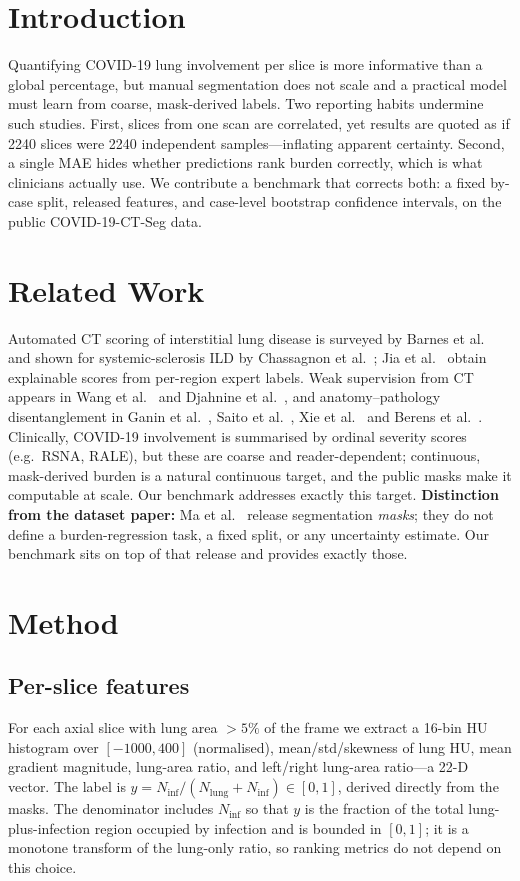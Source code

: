 \documentclass[conference]{IEEEtran}
\begin{document}
\section{Introduction}
Quantifying COVID-19 lung involvement per slice is more informative than a global
percentage, but manual segmentation does not scale and a practical model must
learn from coarse, mask-derived labels. Two reporting habits undermine such
studies. First, slices from one scan are correlated, yet results are quoted as if
2240 slices were 2240 independent samples---inflating apparent certainty.
Second, a single MAE hides whether predictions rank burden correctly, which is
what clinicians actually use. We contribute a benchmark that corrects both: a
fixed by-case split, released features, and case-level bootstrap confidence
intervals, on the public COVID-19-CT-Seg data.

\section{Related Work}
Automated CT scoring of interstitial lung disease is surveyed by Barnes et
al.~\cite{barnes2023mlradiology} and shown for systemic-sclerosis ILD by
Chassagnon et al.~\cite{chassagnon2020dl}; Jia et al.~\cite{jia2024explainable}
obtain explainable scores from per-region expert labels. Weak supervision from CT
appears in Wang et al.~\cite{wang2019weakild} and Djahnine et
al.~\cite{djahnine2024weak}, and anatomy--pathology disentanglement in
Ganin et al.~\cite{ganin2016dann}, Saito et al.~\cite{saito2018mcd}, Xie et
al.~\cite{xie2022disentangle} and Berens et al.~\cite{berens2026shortcut}.
Clinically, COVID-19 involvement is summarised by ordinal severity scores (e.g.\
RSNA, RALE), but these are coarse and reader-dependent; continuous, mask-derived
burden is a natural continuous target, and the public masks make it computable at
scale. Our benchmark addresses exactly this target.
\textbf{Distinction from the dataset paper:} Ma et al.~\cite{ma2021covidseg}
release segmentation \emph{masks}; they do not define a burden-regression task,
a fixed split, or any uncertainty estimate. Our benchmark sits on top of that
release and provides exactly those.

\section{Method}
\subsection{Per-slice features}
For each axial slice with lung area $>5\%$ of the frame we extract a 16-bin HU
histogram over $[-1000,400]$ (normalised), mean/std/skewness of lung HU, mean
gradient magnitude, lung-area ratio, and left/right lung-area ratio---a 22-D
vector. The label is $y=N_{\mathrm{inf}}/(N_{\mathrm{lung}}+N_{\mathrm{inf}})
\in[0,1]$, derived directly from the masks. The denominator includes
$N_{\mathrm{inf}}$ so that $y$ is the fraction of the total lung-plus-infection
region occupied by infection and is bounded in $[0,1]$; it is a monotone
transform of the lung-only ratio, so ranking metrics do not depend on this choice.
\end{document}
